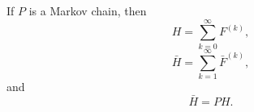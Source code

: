 If $P$ is a Markov chain, then
$$H = \sum_{k=0}^{\infty} F^{(k)},$$
$$\bar{H} = \sum_{k=1}^{\infty} \bar{F}^{(k)},$$
and
$$\bar{H} = PH.$$
